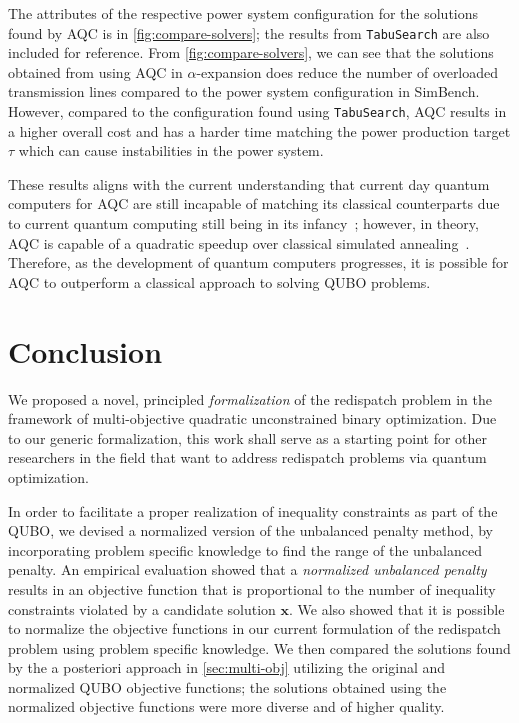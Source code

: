 \documentclass[conference]{IEEEtran}
\makeatletter
\newcommand{\bx}{\boldsymbol{x}}
\newcommand{\QUBO}{\textsc{QUBO}\@\xspace}
\makeatother
\begin{document}
The attributes of the respective power system configuration for the
solutions found by AQC is in \cref{fig:compare-solvers}; the results
from \texttt{TabuSearch} are also included for reference. From
\cref{fig:compare-solvers}, we can see that the solutions obtained from
using AQC in $\alpha$-expansion does reduce the number of overloaded
transmission lines compared to the power system configuration in
SimBench. However, compared to the configuration found using
\texttt{TabuSearch}, AQC results in a higher overall cost and has a
harder time matching the power production target $\tau$ which can cause
instabilities in the power system.

These results aligns with the current understanding that current day
quantum computers for AQC are still incapable of matching its classical
counterparts due to current quantum computing still being in its 
infancy~\cite{quinton2025}; however, in theory, AQC is capable of a
quadratic speedup over classical simulated
annealing~\cite{mukherjee2015}. Therefore, as the development of 
quantum computers progresses, it is possible for AQC to outperform a
classical approach to solving {\QUBO} problems.

\section{Conclusion}
We proposed a novel, principled \textit{formalization} of the redispatch
problem in the framework of multi-objective quadratic unconstrained
binary optimization.  Due to our generic formalization, this work shall
serve as a starting point for other researchers in the field that want
to address redispatch problems via quantum optimization.

In order to facilitate a proper realization of inequality constraints as
part of the {\QUBO}, we devised a normalized version of the unbalanced
penalty method, by incorporating problem specific knowledge to find the
range of the unbalanced penalty. An empirical evaluation showed that a
\textit{normalized unbalanced penalty} results in an objective function
that is proportional to the number of inequality constraints violated by
a candidate solution $\bx$. We also showed that it is possible to
normalize the objective functions in our current formulation of the
redispatch problem using problem specific knowledge. We then compared
the solutions found by the a posteriori approach in \cref{sec:multi-obj}
utilizing the original and normalized {\QUBO} objective functions; the
solutions obtained using the normalized objective functions were more
diverse and of higher quality.
\end{document}
